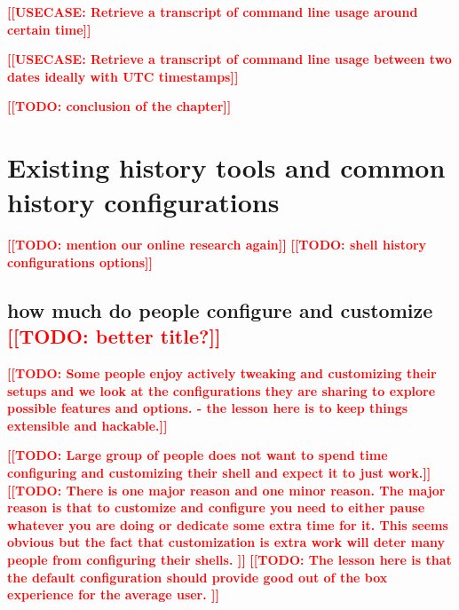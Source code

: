 \documentclass[thesis=M,english]{FITthesis}[2012/10/20]
\newcommand{\todotext}[1]{\textcolor{red}{\textbf{[[#1]]}}}
\newcommand{\redtext}[1]{\textcolor{red}{[[#1]]}}
\newcommand{\blind}[1][1]{\textcolor{mygray}{\Blindtext[#1][1]}}
\begin{document}
\todotext{USECASE: Retrieve a transcript of command line usage around certain time}

\todotext{USECASE: Retrieve a transcript of command line usage between two dates ideally with UTC timestamps}







\todotext{TODO: conclusion of the chapter}

\blind

\section{Existing history tools and common history configurations}

\todotext{TODO: mention our online research again}
\todotext{TODO: shell history configurations options}


\subsection{how much do people configure and customize \redtext{TODO: better title?}} 
\todotext{TODO: Some people enjoy actively tweaking and customizing their setups and we look at the configurations they are sharing to explore possible features and options. - the lesson here is to keep things extensible and hackable.}

\todotext{TODO: Large group of people does not want to spend time configuring and customizing their shell and expect it to just work.}
\todotext{TODO: There is one major reason and one minor reason. The major reason is that to customize and configure you need to either pause whatever you are doing or dedicate some extra time for it. This seems obvious but the fact that customization is extra work will deter many people from configuring their shells. }
\todotext{TODO: The lesson here is that the default configuration should provide good out of the box experience for the average user. }
\end{document}
